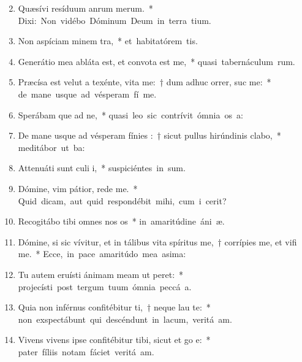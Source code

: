 \begin{flushleft}
\begin{enumerate}[leftmargin=*]
\setcounter{enumi}{1}

\item Quæsívi resíduum anrum merum.~* \mbox{Dixi: Non vidébo Dóminum Deum in terra tium.}
\item Non aspíciam minem tra,~* \mbox{et habitatórem tis.}
\item Generátio mea abláta est, et convota est  me,~* \mbox{quasi tabernáculum rum.}
\item Præcísa est velut a texénte, vita me:~† dum adhuc orrer, suc me:~* \mbox{de mane usque ad vésperam fí me.}
\item Sperábam que ad ne,~* \mbox{quasi leo sic contrívit ómnia os a:}
\item De mane usque ad vésperam fínies :~† sicut pullus hirúndinis  clabo,~* \mbox{meditábor ut ba:}
\item Attenuáti sunt culi i,~* \mbox{suspiciéntes in sum.}
\item Dómine, vim pátior, rede  me.~* \mbox{Quid dicam, aut quid respondébit mihi, cum i cerit?}
\item Recogitábo tibi omnes nos os~* \mbox{in amaritúdine áni æ.}
\item Dómine, si sic vívitur, et in tálibus vita spíritus me,~† corrípies me, et vifi me.~* \mbox{Ecce, in pace amaritúdo mea asima:}
\item Tu autem eruísti ánimam meam ut  peret:~* \mbox{projecísti post tergum tuum ómnia peccá a.}
\item Quia non inférnus confitébitur ti,~† neque  lau te:~* \mbox{non exspectábunt qui descéndunt in lacum, veritá am.}
\item Vivens vivens ipse confitébitur tibi, sicut et go e:~* \mbox{pater fíliis notam fáciet veritá am.}

\end{enumerate}
\end{flushleft}
